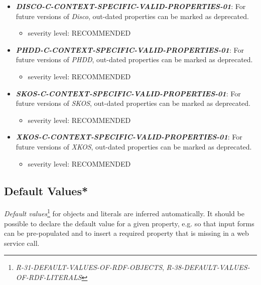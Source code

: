 \documentclass{llncs}
\begin{document}
\begin{itemize}
	\item \textbf{{\em DISCO-C-CONTEXT-SPECIFIC-VALID-PROPERTIES-01}}: For future versions of \emph{Disco}, out-dated properties can be marked as deprecated.
	\begin{itemize}
		\item severity level: RECOMMENDED
	\end{itemize}
\end{itemize}

\begin{itemize}
	\item \textbf{{\em PHDD-C-CONTEXT-SPECIFIC-VALID-PROPERTIES-01}}: For future versions of \emph{PHDD}, out-dated properties can be marked as deprecated.
	\begin{itemize}
		\item severity level: RECOMMENDED
	\end{itemize}
\end{itemize}

\begin{itemize}
	\item \textbf{{\em SKOS-C-CONTEXT-SPECIFIC-VALID-PROPERTIES-01}}: For future versions of \emph{SKOS}, out-dated properties can be marked as deprecated.
	\begin{itemize}
		\item severity level: RECOMMENDED
	\end{itemize}
\end{itemize}

\begin{itemize}
	\item \textbf{{\em XKOS-C-CONTEXT-SPECIFIC-VALID-PROPERTIES-01}}: For future versions of \emph{XKOS}, out-dated properties can be marked as deprecated.
	\begin{itemize}
		\item severity level: RECOMMENDED
	\end{itemize}
\end{itemize}

\subsection{Default Values*}

\emph{Default values}\footnote{{\em R-31-DEFAULT-VALUES-OF-RDF-OBJECTS}, {\em R-38-DEFAULT-VALUES-OF-RDF-LITERALS}} for objects and literals are inferred automatically.
It should be possible to declare the default value for a given property, e.g. so that input forms can be pre-populated and to insert a required property that is missing in a web service call.
\end{document}
